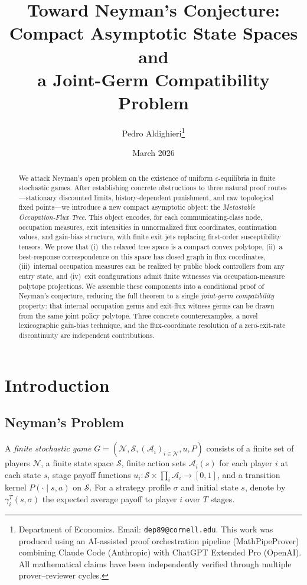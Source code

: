 \documentclass[12pt,a4paper]{article}
\title{\textbf{Toward Neyman's Conjecture:\\Compact Asymptotic State Spaces and\\a Joint-Germ Compatibility Problem}}
\author{Pedro Aldighieri\thanks{Department of Economics. Email: \texttt{dep89@cornell.edu}. This work was produced using an AI-assisted proof orchestration pipeline (MathPipeProver) combining Claude Code (Anthropic) with ChatGPT Extended Pro (OpenAI). All mathematical claims have been independently verified through multiple prover--reviewer cycles.}}
\date{March 2026}
\theoremstyle{definition}
\newcommand{\eps}{\varepsilon}
\newcommand{\cA}{\mathcal{A}}
\newcommand{\cS}{\mathcal{S}}
\newcommand{\cN}{\mathcal{N}}
\begin{document}
\maketitle

\begin{abstract}
We attack Neyman's open problem on the existence of uniform $\eps$-equilibria in finite stochastic games. After establishing concrete obstructions to three natural proof routes---stationary discounted limits, history-dependent punishment, and raw topological fixed points---we introduce a new compact asymptotic object: the \emph{Metastable Occupation-Flux Tree}. This object encodes, for each communicating-class node, occupation measures, exit intensities in unnormalized flux coordinates, continuation values, and gain-bias structure, with finite exit jets replacing first-order susceptibility tensors. We prove that (i)~the relaxed tree space is a compact convex polytope, (ii)~a best-response correspondence on this space has closed graph in flux coordinates, (iii)~internal occupation measures can be realized by public block controllers from any entry state, and (iv)~exit configurations admit finite witnesses via occupation-measure polytope projections. We assemble these components into a conditional proof of Neyman's conjecture, reducing the full theorem to a single \emph{joint-germ compatibility} property: that internal occupation germs and exit-flux witness germs can be drawn from the same joint policy polytope. Three concrete counterexamples, a novel lexicographic gain-bias technique, and the flux-coordinate resolution of a zero-exit-rate discontinuity are independent contributions.
\end{abstract}

\tableofcontents

\section{Introduction}
\label{sec:intro}

\subsection{Neyman's Problem}

A \emph{finite stochastic game} $G = (\cN, \cS, (\cA_i)_{i \in \cN}, u, P)$ consists of a finite set of players $\cN$, a finite state space $\cS$, finite action sets $\cA_i(s)$ for each player $i$ at each state $s$, stage payoff functions $u_i \colon \cS \times \prod_i \cA_i \to [0,1]$, and a transition kernel $P(\cdot \mid s, a)$ on $\cS$. For a strategy profile $\sigma$ and initial state $s$, denote by $\gamma_i^T(s, \sigma)$ the expected average payoff to player $i$ over $T$ stages.
\end{document}
